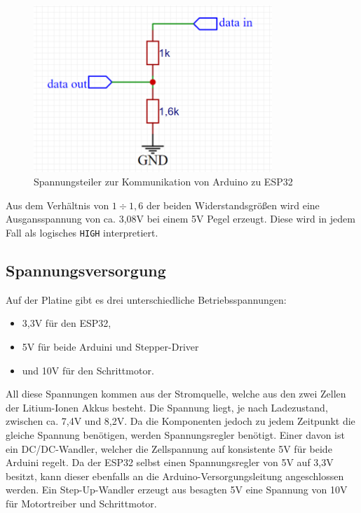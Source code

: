 \begin{figure}[h]
	\begin{center}
		\includegraphics[width=9cm]{spannungsteiler.PNG}
		\caption{\label{pic:spannungsteiler} Spannungsteiler zur Kommunikation von Arduino zu ESP32}
	\end{center}
\end{figure}

Aus dem Verhältnis von $1 \div 1,6$ der beiden Widerstandsgrößen wird eine Ausgansspannung von ca. 3,08V bei einem 5V Pegel erzeugt. Diese wird in jedem Fall als logisches \texttt{HIGH} interpretiert.

\subsection{Spannungsversorgung}
Auf der Platine gibt es drei unterschiedliche Betriebsspannungen: 
\begin{center}
	\begin{itemize}
		\item 3,3V für den ESP32,
		\item 5V für beide Arduini und Stepper-Driver
		\item und 10V für den Schrittmotor.
	\end{itemize}
\end{center}
All diese Spannungen kommen aus der Stromquelle, welche aus den zwei Zellen der Litium-Ionen Akkus besteht. Die Spannung liegt, je nach Ladezustand, zwischen ca. 7,4V und 8,2V. Da die Komponenten jedoch zu jedem Zeitpunkt die gleiche Spannung benötigen, werden Spannungsregler benötigt. 
Einer davon ist ein DC/DC-Wandler, welcher die Zellspannung auf konsistente 5V für beide Arduini regelt. Da der ESP32 selbst einen Spannungsregler von 5V auf 3,3V besitzt, kann dieser ebenfalls an die Arduino-Versorgungsleitung angeschlossen werden. Ein Step-Up-Wandler erzeugt aus besagten 5V eine Spannung von 10V für Motortreiber und Schrittmotor. 

